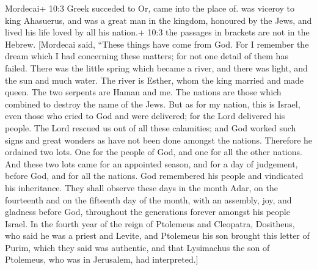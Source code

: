  Mordecai+ 10:3 Greek succeded to Or, came into the place
of. was viceroy to king Ahasuerus, and was a great man in the kingdom,
honoured by the Jews, and lived his life loved by all his nation.+ 10:3
the passages in brackets are not in the Hebrew.  {[}Mordecai
said, ``These things have come from God.  For I remember the
dream which I had concerning these matters; for not one detail of them
has failed.  There was the little spring which became a
river, and there was light, and the sun and much water. The river is
Esther, whom the king married and made queen.  The two
serpents are Haman and me.  The nations are those which
combined to destroy the name of the Jews.  But as for my
nation, this is Israel, even those who cried to God and were delivered;
for the Lord delivered his people. The Lord rescued us out of all these
calamities; and God worked such signs and great wonders as have not been
done amongst the nations.  Therefore he ordained two lots.
One for the people of God, and one for all the other nations.
 And these two lots came for an appointed season, and for a
day of judgement, before God, and for all the nations.  God
remembered his people and vindicated his inheritance.  They
shall observe these days in the month Adar, on the fourteenth and on the
fifteenth day of the month, with an assembly, joy, and gladness before
God, throughout the generations forever amongst his people Israel.
 In the fourth year of the reign of Ptolemeus and
Cleopatra, Dositheus, who said he was a priest and Levite, and Ptolemeus
his son brought this letter of Purim, which they said was authentic, and
that Lysimachus the son of Ptolemeus, who was in Jerusalem, had
interpreted.{]}
